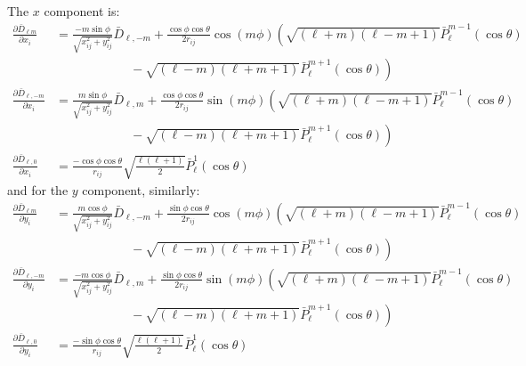 \documentclass[
journal=jctcce, %
manuscript=article, layout=onecolumn]{achemso}
\begin{document}
The $x$ component is:
\begin{align}
    \frac{\partial \bar{D}_{\ell m}}{\partial x_i} &= \frac{-m\sin\phi}{\sqrt{x_{ij}^2 + y_{ij}^2}} \bar{D}_{\ell,-m} + \frac{\cos\phi \cos\theta}{2r_{ij}}\cos(m\phi)\left(
        \sqrt{(\ell + m)(\ell - m + 1)}\bar{P}_\ell^{m-1}(\cos\theta)\right.\nonumber\\
        &\qquad\qquad\qquad\left. {} - \sqrt{(\ell - m)(\ell + m + 1)}\bar{P}_\ell^{m+1}(\cos\theta)\right)\label{eq:dbx0}\\
    \frac{\partial \bar{D}_{\ell,-m}}{\partial x_i} &= \frac{m\sin\phi}{\sqrt{x_{ij}^2 + y_{ij}^2}} \bar{D}_{\ell,m} + \frac{\cos\phi \cos\theta}{2r_{ij}}\sin(m\phi)\left(
        \sqrt{(\ell + m)(\ell - m + 1)}\bar{P}_\ell^{m-1}(\cos\theta)\right.\nonumber\\
        &\qquad\qquad\qquad\left. {} - \sqrt{(\ell - m)(\ell + m + 1)}\bar{P}_\ell^{m+1}(\cos\theta)\right)\label{eq:dbx1}\\
    \frac{\partial \bar{D}_{\ell,0}}{\partial x_i} &=
        \frac{-\cos\phi \cos\theta}{r_{ij}}\sqrt{\frac{\ell(\ell+1)}{2}}\bar{P}_\ell^1(\cos\theta)\label{eq:dbx2}
\end{align}
and for the $y$ component, similarly:
\begin{align}
    \frac{\partial \bar{D}_{\ell m}}{\partial y_i} &= \frac{m\cos\phi}{\sqrt{x_{ij}^2 + y_{ij}^2}} \bar{D}_{\ell,-m} + \frac{\sin\phi \cos\theta}{2r_{ij}}\cos(m\phi)\left(
        \sqrt{(\ell + m)(\ell - m + 1)}\bar{P}_\ell^{m-1}(\cos\theta)\right.\nonumber\\
        &\qquad\qquad\qquad\left. {} - \sqrt{(\ell - m)(\ell + m + 1)}\bar{P}_\ell^{m+1}(\cos\theta)\right)\label{eq:dby0}\\
    \frac{\partial \bar{D}_{\ell,-m}}{\partial y_i} &= \frac{-m\cos\phi}{\sqrt{x_{ij}^2 + y_{ij}^2}} \bar{D}_{\ell,m} + \frac{\sin\phi \cos\theta}{2r_{ij}}\sin(m\phi)\left(
        \sqrt{(\ell + m)(\ell - m + 1)}\bar{P}_\ell^{m-1}(\cos\theta)\right.\nonumber\\
        &\qquad\qquad\qquad\left. {} - \sqrt{(\ell - m)(\ell + m + 1)}\bar{P}_\ell^{m+1}(\cos\theta)\right)\label{eq:dby1}\\
    \frac{\partial \bar{D}_{\ell,0}}{\partial y_i} &=
        \frac{-\sin\phi \cos\theta}{r_{ij}}\sqrt{\frac{\ell(\ell+1)}{2}}\bar{P}_\ell^1(\cos\theta)\label{eq:dby2}
\end{align}
\end{document}
